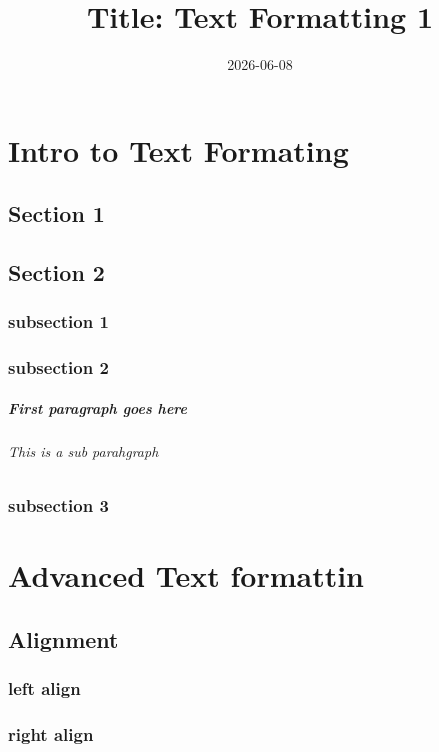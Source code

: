 \documentclass{book}
\title{Title: Text Formatting 1}
\date{2026-06-08}
\begin{document}
	\maketitle %
	\thispagestyle{empty}
	\setcounter{page}{1}
	
	\chapter{Intro to Text Formating}
	\section{Section 1}
	\section{Section 2}
	\subsection{subsection 1}
	\lipsum[1-2]
	\subsection{subsection 2}
	\paragraph{First paragraph goes here}
	\subparagraph{This is a sub parahgraph}
	\subsection{subsection 3}
	
	\chapter{Advanced Text formattin}
	\section{Alignment}
	\subsection*{left align}
		\begin{flushleft}
	 		\lipsum[1]
		\end{flushleft}
	\subsection*{right align}
		\begin{flushright}
			\lipsum[1]
		\end{flushright}
\end{document}
